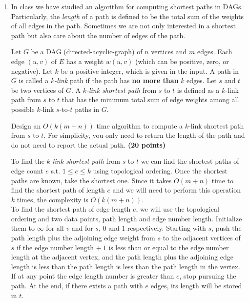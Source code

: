 \documentclass[11pt]{article}
\begin{document}
\begin{enumerate}
\begin{tcolorbox}
\end{tcolorbox}

  \item %
In class we have studied an algorithm for computing shortest paths in DAGs.
Particularly, the {\em length} of a path is defined to be the total sum of the
weights of all edges in the path. Sometimes we are not only interested in a
shortest path but also care about the number of edges of the path.

Let $G$ be a DAG (directed-acyclic-graph) of $n$ vertices and $m$ edges. Each
edge $(u,v)$ of $E$ has a weight $w(u,v)$ (which can be positive, zero, or
negative). Let $k$ be a positive integer, which is given in the input. A path
in $G$ is called a {\em $k$-link} path if the path has {\bf no more than} $k$
edges. Let $s$ and $t$ be two vertices of $G$. A {\em $k$-link shortest path}
from $s$ to $t$ is defined as a $k$-link path from $s$ to $t$ that has the
minimum total sum of edge weights among all possible $k$-link $s$-to-$t$ paths
in $G$.

Design an $O(k(m+n))$ time algorithm to compute a $k$-link shortest path from $
s$ to $t$. For simplicity, you only need to return the length of the path and
do not need to report the actual path.
{\hfill \bf (20 points)}

\begin{tcolorbox}

  To find the {\em $k$-link shortest path} from $s$ to $t$ we can find
  the shortest paths of edge count $e$ s.t. $1 \leq e \leq k$ using topological
  ordering. Once the shortest paths are known, take the shortest one.
  Since it takes $O(m+n)$ time to find the shortest path of length $e$
  and we will need to perform this operation $k$ times, the complexity is $O(k(m+n))$.\\

  To find the shortest path of edge length $e$, we will use the topological ordering
  and two data points, path length and edge number length. Initialize them to $\infty$
  for all $v$ and for $s$, $0$ and $1$ respectively.
  Starting with $s$, push the path length plus the adjoining edge weight from
  $s$ to the adjacent vertices of $s$ if the edge number length $+\ 1$ is
  less than or equal to the edge number length at the adjacent vertex,
  and the path length plus the adjoining edge length is less than the path length
  is less than the path length in the vertex. If at any point the edge length
  number is greater than $e$, stop pursuing the path. At the end, if there
  exists a path with $e$ edges, its length will be stored in $t$.

\end{tcolorbox}


\end{enumerate}
\end{document}
